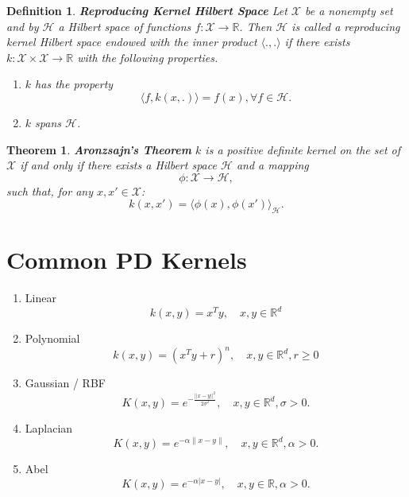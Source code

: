 \documentclass{article}[12pt]
\newtheorem{thm}{Theorem}
\newtheorem{defn}{Definition}
\begin{document}
\begin{defn}{\textbf{Reproducing Kernel Hilbert Space}}
Let $\mathcal X$ be a nonempty set and by $\mathcal H$ a Hilbert space of functions $f: \mathcal X \rightarrow \mathbb R$. Then $\mathcal H$ is called a reproducing kernel Hilbert space endowed with the inner product $\langle.,.\rangle$ if there exists $k: \mathcal X \times \mathcal X \rightarrow \mathbb R$ with the following properties.
\begin{enumerate}
\item $k$ has the property 
\begin{equation}
\langle f, k(x, .) \rangle = f(x), \forall f \in \mathcal H.
\end{equation}
\item $k$ spans $\mathcal H$.
\end{enumerate}
\end{defn}

\begin{thm}{\textbf{Aronzsajn's Theorem}} \label{thm:aron}
$k$ is a positive definite kernel on the set of $\mathcal X$ if and only if there exists a Hilbert space $\mathcal H$ and a mapping
\begin{equation}
\phi: \mathcal X \rightarrow \mathcal H,
\end{equation}
such that, for any $x, x' \in \mathcal X$:
\begin{equation}
k(x, x') = \langle \phi(x), \phi(x') \rangle_{\mathcal H}.
\end{equation}
\label{thm:aron}
\end{thm}


\section{Common PD Kernels} \label{sec:commpd}

\begin{enumerate}
\item Linear
\begin{equation}
k(x, y)=x^{T} y, \quad x, y \in \mathbb{R}^{d}
\end{equation}
\item Polynomial
\begin{equation}
k(x, y)=\left(x^{T} y+r\right)^{n}, \quad x, y \in \mathbb{R}^{d}, r \geq 0
\end{equation}
\item Gaussian / RBF
\begin{equation}
K(x, y)=e^{-\frac{||x-y||^2}{2 \sigma^2}}, \quad x, y \in \mathbb{R}^{d}, \sigma > 0.
\end{equation}
\item Laplacian
\begin{equation}
K(x, y)=e^{-\alpha\|x-y\|}, \quad x, y \in \mathbb{R}^{d}, \alpha>0.
\end{equation}
\item Abel 
\begin{equation}
K(x, y)=e^{-\alpha|x-y|}, \quad x, y \in \mathbb{R}, \alpha>0.
\end{equation}
\end{enumerate}
\end{document}
